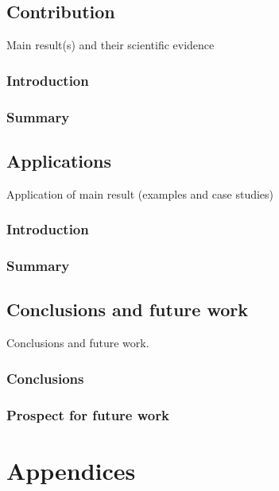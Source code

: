 \documentclass[
  oneside,
  11pt, a4paper,
  footinclude=true,
  headinclude=true,
  cleardoublepage=empty
]{scrbook}
\begin{document}
\chapter{Contribution}
	Main result(s) and their scientific evidence
\section{Introduction}
\section{Summary}

\chapter{Applications}
	Application of main result (examples and case studies)
\section{Introduction}
\section{Summary}

\chapter{Conclusions and future work}
	Conclusions and future work.
\section{Conclusions}
\section{Prospect for future work}
		
\cleardoublepage


\printindex
	
	\appendix
	\renewcommand\chaptername{Appendix}


\part{Appendices}
\end{document}
